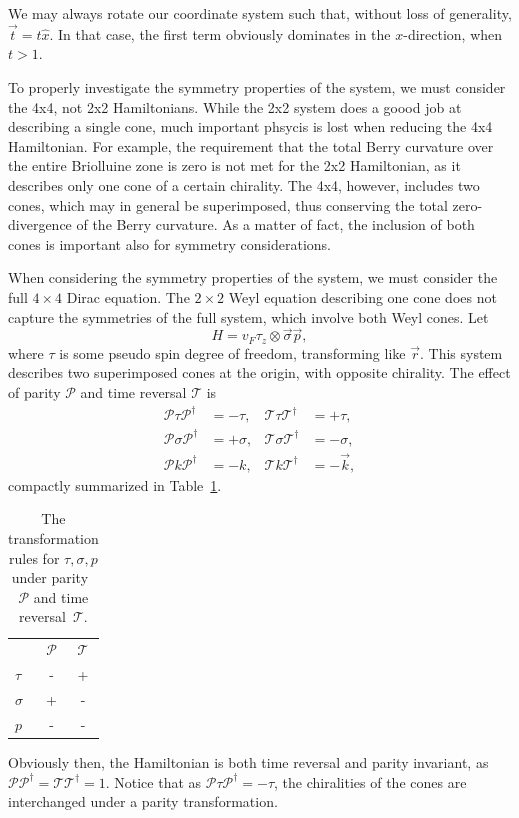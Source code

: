 \begin{Proof}
  We may always rotate our coordinate system such that, without loss of generality, \(\vec{t} = t \hat{x}\).
  In that case, the first term obviously dominates in the \(x\)-direction, when $t>1$.
\end{Proof}

To properly investigate the symmetry properties of the system, we must consider the 4x4, not 2x2 Hamiltonians.
While the 2x2 system does a goood job at describing a single cone, much important phsycis is lost when reducing the 4x4 Hamiltonian.
For example, the requirement that the total Berry curvature over the entire Briolluine zone is zero is not met for the 2x2 Hamiltonian, as it describes only one cone of a certain chirality.
The 4x4, however, includes two cones, which may in general be superimposed, thus conserving the total zero-divergence of the Berry curvature.
As a matter of fact, the inclusion of both cones is important also for symmetry considerations.

When considering the symmetry properties of the system, we must consider the full \( 4\times 4 \) Dirac equation.
The \( 2\times 2 \) Weyl equation describing one cone does not capture the symmetries of the full system, which involve both Weyl cones.
Let
\[
  H = v_{F} \tau _{z} \otimes \vec{\sigma} \vec{p},
\]
where \(\tau \) is some pseudo spin degree of freedom, transforming like \(\vec{r}\).
This system describes two superimposed cones at the origin, with opposite chirality.
The effect of parity \(\mathcal{P}\) and time reversal \(\mathcal{T}\) is
\begin{equation}
  \label{eq:135}
  \begin{aligned}
    \mathcal{P} \tau \mathcal{P}^{\dagger} &= -\tau, & \mathcal{T} \tau \mathcal{T}^{\dagger} &= +\tau,\\
    \mathcal{P} \sigma  \mathcal{P}^{\dagger} &= + \sigma,  & \mathcal{T} \sigma  \mathcal{T}^{\dagger} &= -\sigma, \\
    \mathcal{P} k \mathcal{P}^{\dagger} &= -k, & \mathcal{T} k \mathcal{T}^{\dagger} &= -\vec{k},
  \end{aligned}
\end{equation}
compactly summarized in Table~\ref{tab:sign-transform}.
\begin{table}[h]
  \centering
  \begin{tabular}{lcc}
    \toprule
    & \(\mathcal{P}\) & \(\mathcal{T}\)\\
    \cmidrule{2-3}
    \(\tau \) & - & +\\
    \(\sigma \) & + & -\\
    \(p\) & - & -\\
    \bottomrule
  \end{tabular}
  \caption{The transformation rules for \( \tau, \sigma, p \) under parity~\( \mathcal{P} \) and time reversal~\( \mathcal{T} \).
   \label{tab:sign-transform}
  }
\end{table}
Obviously then, the Hamiltonian is both time reversal and parity invariant, as \(\mathcal{P} \mathcal{P}^{\dagger} = \mathcal{T} \mathcal{T}^{\dagger} = 1\).
Notice that as \( \mathcal{P} \tau \mathcal{P}^{\dagger} = - \tau \), the chiralities of the cones are interchanged under a parity transformation.

